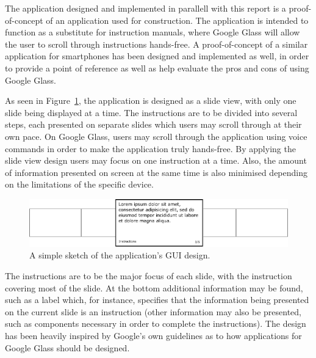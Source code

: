 The application designed and implemented in parallell with this report is a proof-of-concept of an application used for construction. The application is intended to function as a substitute for instruction manuals, where Google Glass will allow the user to scroll through instructions hands-free. A proof-of-concept of a similar application for smartphones has been designed and implemented as well, in order to provide a point of reference as well as help evaluate the pros and cons of using Google Glass.

As seen in Figure~\ref{cardDesign}, the application is designed as a slide view, with only one slide being displayed at a time. The instructions are to be divided into several steps, each presented on separate slides which users may scroll through at their own pace. On Google Glass, users may scroll through the application using voice commands in order to make the application truly hands-free. By applying the slide view design users may focus on one instruction at a time. Also, the amount of information presented on screen at the same time is also minimised depending on the limitations of the specific device.

	\begin{figure}[ht!]
		\centering
		\includegraphics[width=150mm]{images/cardDesign2}
		\caption{A simple sketch of the application's GUI design.}
		\label{cardDesign}
	\end{figure}

The instructions are to be the major focus of each slide, with the instruction covering most of the slide. At the bottom additional information may be found, such as a label which, for instance, specifies that the information being presented on the current slide is an instruction (other information may also be presented, such as components necessary in order to complete the instructions). The design has been heavily inspired by Google's own guidelines as to how applications for Google Glass should be designed.
